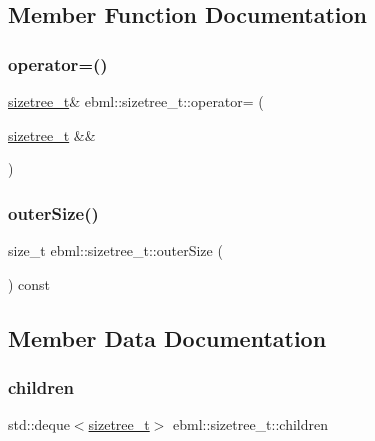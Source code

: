 \subsection{Member Function Documentation}
\mbox{\label{structebml_1_1sizetree__t_a48e8c0b46c4dbf6a6aa467b3c8f5d896}} 
\subsubsection{\texorpdfstring{operator=()}{operator=()}}
{\footnotesize\ttfamily \mbox{\hyperlink{structebml_1_1sizetree__t}{sizetree\+\_\+t}}\& ebml\+::sizetree\+\_\+t\+::operator= (\begin{DoxyParamCaption}\item[{\mbox{\hyperlink{structebml_1_1sizetree__t}{sizetree\+\_\+t}} \&\&}]{ }\end{DoxyParamCaption})}

\mbox{\label{structebml_1_1sizetree__t_acbebda277c477cf6872985ee556bf329}} 
\subsubsection{\texorpdfstring{outer\+Size()}{outerSize()}}
{\footnotesize\ttfamily size\+\_\+t ebml\+::sizetree\+\_\+t\+::outer\+Size (\begin{DoxyParamCaption}{ }\end{DoxyParamCaption}) const}



\subsection{Member Data Documentation}
\mbox{\label{structebml_1_1sizetree__t_a5b13f1d6e607ba1b44be5ed3ccff549f}} 
\subsubsection{\texorpdfstring{children}{children}}
{\footnotesize\ttfamily std\+::deque$<$\mbox{\hyperlink{structebml_1_1sizetree__t}{sizetree\+\_\+t}}$>$ ebml\+::sizetree\+\_\+t\+::children}

